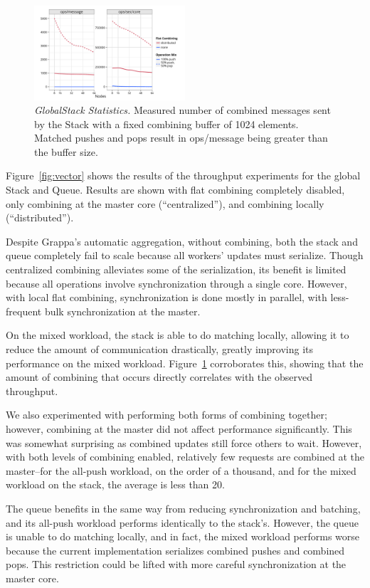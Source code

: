 \begin{figure}[t]
  \centering
  \includegraphics[width=0.5\textwidth]{data/plots/stack_stats.pdf}
  \caption{\emph{GlobalStack Statistics.}
    Measured number of combined messages sent by the Stack with a fixed combining buffer of 1024 elements.
    Matched pushes and pops result in ops/message being greater than the buffer size.
  }
  \label{fig:stack_stats}
\end{figure}

Figure~\ref{fig:vector} shows the results of the throughput experiments for the global Stack and Queue. Results are shown with flat combining completely disabled, only combining at the master core (``centralized''), and combining locally (``distributed'').

Despite Grappa's automatic aggregation, without combining, both the stack and queue completely fail to scale because all workers' updates must serialize.
Though centralized combining alleviates some of the serialization, its benefit is limited 
because all operations involve synchronization through a single core.
However, with local flat combining, synchronization is done mostly in parallel, with less-frequent bulk synchronization at the master.

On the mixed workload, the stack is able to do matching locally, allowing it to reduce the amount of communication drastically, greatly improving its performance on the mixed workload. Figure~\ref{fig:stack_stats} corroborates this, showing that the amount of combining that occurs directly correlates with the observed throughput.

We also experimented with performing both forms of combining together; however, combining at the master did not affect performance significantly. This was somewhat surprising as combined updates still force others to wait. However, with both levels of combining enabled, relatively few requests are combined at the master--for the all-push workload, on the order of a thousand, and for the mixed workload on the stack, the average is less than 20.

The queue benefits in the same way from reducing synchronization and batching, and its all-push workload performs identically to the stack's.
However, the queue is unable to do matching locally, and in fact, the mixed workload performs worse because the current implementation serializes combined pushes and combined pops. This restriction could be lifted with more careful synchronization at the master core.


